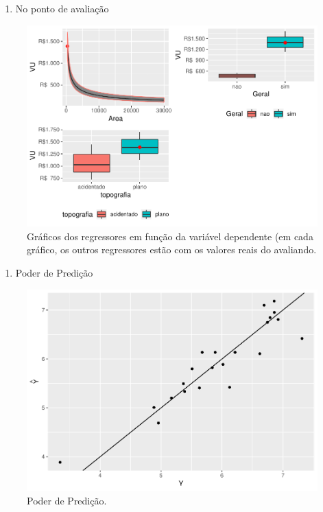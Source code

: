 \documentclass[]{article}
\providecommand{\tightlist}{%
  \setlength{\itemsep}{0pt}\setlength{\parskip}{0pt}}
\begin{document}
\newpage

\begin{enumerate}
\def\labelenumi{\alph{enumi}.}
\setcounter{enumi}{1}
\tightlist
\item
  No ponto de avaliação
\end{enumerate}

\begin{figure}[H]

{\centering \includegraphics[width=1\linewidth]{Report_files/figure-latex/unnamed-chunk-9-1} 

}

\caption{Gráficos dos regressores em função da variável dependente (em cada gráfico, os outros regressores estão com os valores reais do avaliando.}\label{fig:unnamed-chunk-9}
\end{figure}

\newpage

\begin{enumerate}
\def\labelenumi{\Roman{enumi}.}
\setcounter{enumi}{3}
\tightlist
\item
  Poder de Predição
\end{enumerate}

\begin{figure}[H]

{\centering \includegraphics[width=0.5\linewidth]{Report_files/figure-latex/unnamed-chunk-10-1} 

}

\caption{Poder de Predição.}\label{fig:unnamed-chunk-10}
\end{figure}
\end{document}

